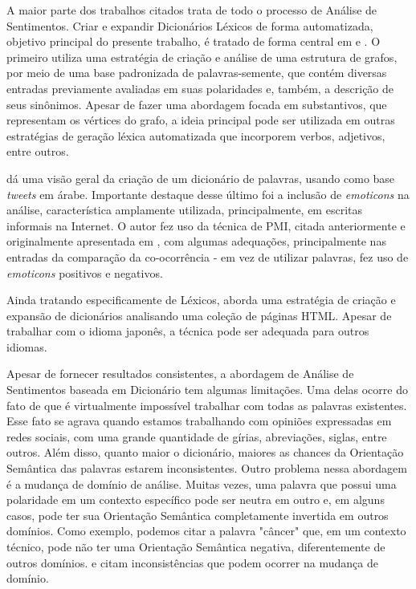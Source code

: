 \documentclass[a4paper,11pt]{article}
\begin{document}
A maior parte dos trabalhos citados trata de todo o processo de Análise de Sentimentos. Criar e expandir Dicionários Léxicos de forma automatizada, objetivo principal do presente trabalho, é tratado de forma central em \cite{widdows2002graph} e \cite{duwairi2015detecting}. O primeiro utiliza uma estratégia de criação e análise de uma estrutura de grafos, por meio de uma base padronizada de palavras-semente, que contém diversas entradas previamente avaliadas em suas polaridades e, também, a descrição de seus sinônimos. Apesar de fazer uma abordagem focada em substantivos, que representam os vértices do grafo, a ideia principal pode ser utilizada em outras estratégias de geração léxica automatizada que incorporem verbos, adjetivos, entre outros. 

\cite{duwairi2015detecting} dá uma visão geral da criação de um dicionário de palavras, usando como base \emph{tweets} em árabe. Importante destaque desse último foi a inclusão de \emph{emoticons} na análise, característica amplamente utilizada, principalmente, em escritas informais na Internet. O autor fez uso da técnica de PMI, citada anteriormente e originalmente apresentada em  \cite{Turney2002}, com algumas adequações, principalmente nas entradas da comparação da co-ocorrência - em vez de utilizar palavras, fez uso de \emph{emoticons} positivos e negativos.

Ainda tratando especificamente de Léxicos, \cite{kaji} aborda uma estratégia de criação e expansão de dicionários analisando uma coleção de páginas HTML. Apesar de trabalhar com o idioma japonês, a técnica pode ser adequada para outros idiomas.

Apesar de fornecer resultados consistentes, a abordagem de Análise de Sentimentos baseada em Dicionário tem algumas limitações. Uma delas ocorre do fato de que é virtualmente impossível trabalhar com todas as palavras existentes. Esse fato se agrava quando estamos trabalhando com opiniões expressadas em redes sociais, com uma grande quantidade de gírias, abreviações, siglas, entre outros. Além disso, quanto maior o dicionário, maiores as chances da Orientação Semântica das palavras estarem inconsistentes. Outro problema nessa abordagem é a mudança de domínio de análise. Muitas vezes, uma palavra que possui uma polaridade em um contexto específico pode ser neutra em outro e, em alguns casos, pode ter sua Orientação Semântica completamente invertida em outros domínios. Como exemplo, podemos citar a palavra "câncer" que, em um contexto técnico, pode não ter uma Orientação Semântica negativa, diferentemente de outros domínios. \cite{kdir16} e \cite{Abbasi} citam inconsistências que podem ocorrer na mudança de domínio.
\end{document}
